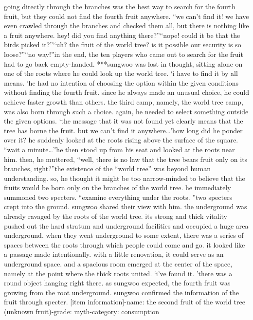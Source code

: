  going directly through the branches was the best way to search for the fourth fruit, but they could not find the fourth fruit anywhere.
“we can’t find it! we have even crawled through the branches and checked them all, but there is nothing like a fruit anywhere.
 hey! did you find anything there?”“nope! could it be that the birds picked it?”“uh? the fruit of the world tree? is it possible our security is so loose?”“no way!”in the end, the ten players who came out to search for the fruit had to go back empty-handed.
***sungwoo was lost in thought, sitting alone on one of the roots where he could look up the world tree.
‘i have to find it by all means.
’he had no intention of choosing the option within the given conditions without finding the fourth fruit.
 since he always made an unusual choice, he could achieve faster growth than others.
the third camp, namely, the world tree camp, was also born through such a choice.
 again, he needed to select something outside the given options.
‘the message that it was not found yet clearly means that the tree has borne the fruit.
 but we can’t find it anywhere…’how long did he ponder over it? he suddenly looked at the roots rising above the surface of the square.
“wait a minute…”he then stood up from his seat and looked at the roots near him.
then, he muttered, “well, there is no law that the tree bears fruit only on its branches, right?”the existence of the “world tree” was beyond human understanding.
so, he thought it might be too narrow-minded to believe that the fruits would be born only on the branches of the world tree.
he immediately summoned two specters.
“examine everything under the roots.
”two specters crept into the ground.
 sungwoo shared their view with him.
the underground was already ravaged by the roots of the world tree.
 its strong and thick vitality pushed out the hard stratum and underground facilities and occupied a huge area underground.
when they went underground to some extent, there was a series of spaces between the roots through which people could come and go.
 it looked like a passage made intentionally.
 with a little renovation, it could serve as an underground space.
and a spacious room emerged at the center of the space, namely at the point where the thick roots united.
‘i’ve found it.
’there was a round object hanging right there.
 as sungwoo expected, the fourth fruit was growing from the root underground.
sungwoo confirmed the information of the fruit through specter.
[item information]-name: the second fruit of the world tree (unknown fruit)-grade: myth-category: consumption

